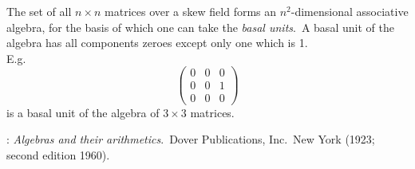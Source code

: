 \documentclass[12pt]{article}
\theoremstyle{definition}
\begin{document}
The set of all $n\!\times\!n$ matrices over a skew field forms an $n^2$-dimensional associative algebra, for the basis of which one can take the \emph{basal units}.\, A basal unit of the algebra has all components zeroes except only one which is 1.\\

E.g.
$$\begin{pmatrix}
0 & 0 & 0 \\
0 & 0 & 1 \\
0 & 0 & 0 
\end{pmatrix}$$
is a basal unit of the algebra of $3\!\times\!3$ matrices.

\begin{thebibliography}{8}
: {\em Algebras and their arithmetics}.\, Dover Publications, Inc.\, New York (1923; second edition 1960).
\end{thebibliography}
\end{document}

